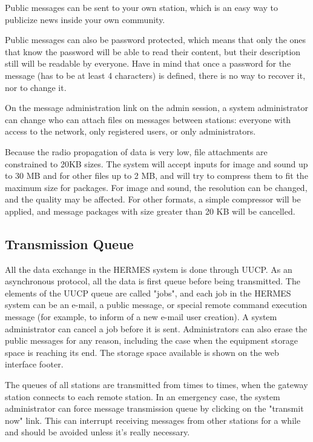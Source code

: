 \documentclass[11pt,a4paper]{article}
\begin{document}
Public messages can be sent to your own station, which is an easy way to publicize news inside your own community.

Public messages can also be password protected, which means that only the ones that know the password will be able to read their content, but their description still will be readable by everyone. Have in mind that once a password for the message (has to be at least 4 characters) is defined, there is no way to recover it, nor to change it.

On the message administration link on the admin session, a system administrator can change who can attach files on messages between stations: everyone with access to the network, only registered users, or only administrators.

Because the radio propagation of data is very low, file attachments are constrained to 20KB sizes. The system will accept inputs for image and sound up to 30 MB and for other files up to 2 MB, and will try to compress them to fit the maximum size for packages. For image and sound, the resolution can be changed, and the quality may be affected. For other formats, a simple compressor will be applied, and message packages with size greater than 20 KB will be cancelled.

\subsection{Transmission Queue}

All the data exchange in the HERMES system is done through UUCP. As an asynchronous protocol, 
all the data is first queue before being transmitted. The elements of the UUCP queue are called "jobs", and each job in the HERMES system can be an e-mail, a public message, or special remote command execution message (for example, to inform of a new e-mail user creation). A system administrator can cancel a job before it is sent. Administrators can also erase the public messages for any reason, including the case when the equipment storage space is reaching its end. The storage space available is shown on the web interface footer.

The queues of all stations are transmitted from times to times, when the gateway station connects to each remote station. In an emergency case, the system administrator can force message transmission queue by clicking on the "transmit now" link. This can interrupt receiving messages from other stations for a while and should be avoided unless it's really necessary.
\end{document}
